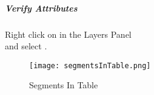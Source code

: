 \clearpage

\subparagraph*{Verify Attributes\\}

Right click on \emph{} in the Layers Panel\\

\noindent and select \textbf{}.\\


\begin{figure}[H]
\centering
    \texttt{[image: segmentsInTable.png]}
\vspace{-.1in}

\caption{Segments In Table}
\end{figure}
\clearpage

